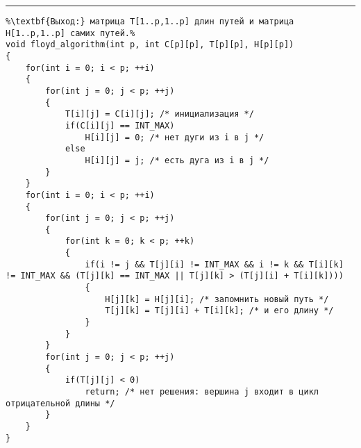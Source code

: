 \vspace{5pt} \hrule
\begin{lstlisting}[caption={Алгоритм Флойда}, label=p285, escapechar=\%]
%\noindent\textbf{Вход:} матрица C[1..p,1..p] длин дуг.\\%
%\textbf{Выход:} матрица T[1..p,1..p] длин путей и матрица H[1..p,1..p] самих путей.%
void floyd_algorithm(int p, int C[p][p], T[p][p], H[p][p])
{
	for(int i = 0; i < p; ++i)
	{
		for(int j = 0; j < p; ++j)
		{
			T[i][j] = C[i][j]; /* инициализация */
			if(C[i][j] == INT_MAX)
				H[i][j] = 0; /* нет дуги из i в j */
			else
				H[i][j] = j; /* есть дуга из i в j */
		}
	}
	for(int i = 0; i < p; ++i)
	{
		for(int j = 0; j < p; ++j)
		{
			for(int k = 0; k < p; ++k)
			{
				if(i != j && T[j][i] != INT_MAX && i != k && T[i][k] != INT_MAX && (T[j][k] == INT_MAX || T[j][k] > (T[j][i] + T[i][k])))
				{
					H[j][k] = H[j][i]; /* запомнить новый путь */
					T[j][k] = T[j][i] + T[i][k]; /* и его длину */
				}
			}
		}
		for(int j = 0; j < p; ++j)
		{
			if(T[j][j] < 0)
				return; /* нет решения: вершина j входит в цикл отрицательной длины */
		}
	}
}
\end{lstlisting}
